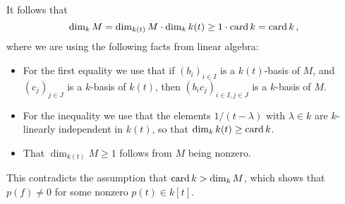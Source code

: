 \begin{remark}
  It follows that
  \[
          \dim_k M
    =     \dim_{k(t)} M \cdot \dim_k k(t)
    \geq  1 \cdot \operatorname{card} k
    =     \operatorname{card} k \,,
  \]
  where we are using the following facts from linear algebra:
  \begin{itemize}
    \item
      For the first equality we use that if $(b_i)_{i \in I}$ is a $k(t)$-basis of $M$, and $(c_j)_{j \in J}$ is a $k$-basis of $k(t)$, then $(b_i c_j)_{i \in I, j \in J}$ is a $k$-basis of $M$.
    \item
      For the inequality we use that the elements $1/(t-\lambda)$ with $\lambda \in k$ are $k$-linearly independent in $k(t)$, so that $\dim_k k(t) \geq \operatorname{card} k$.
    \item
      That $\dim_{k(t)} M \geq 1$ follows from $M$ being nonzero.
  \end{itemize}
  This contradicts the assumption that $\operatorname{card} k > \dim_k M$, which shows that $p(f) \neq 0$ for some nonzero $p(t) \in k[t]$.
\end{remark}





